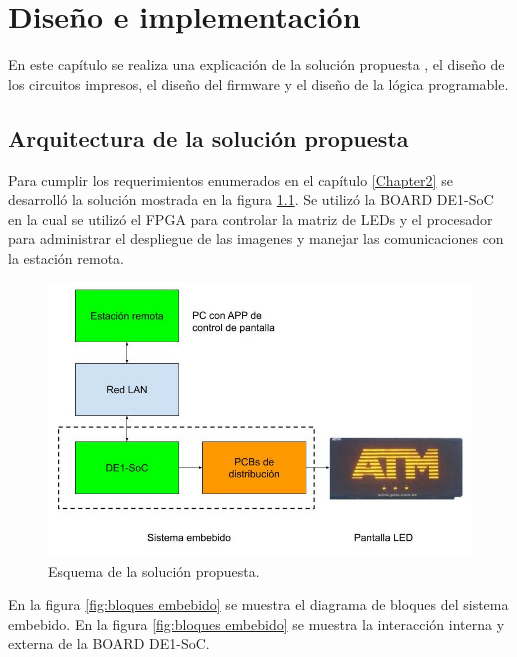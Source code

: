 \chapter{Diseño e implementación} %

\label{Chapter3} 
En este capítulo se realiza una explicación de la solución propuesta , el diseño de los circuitos impresos, el diseño del firmware y el diseño de la lógica programable.

\section{ Arquitectura de la solución propuesta}
Para cumplir los requerimientos enumerados en el capítulo \ref{Chapter2} se desarrolló la solución mostrada en la figura \ref{fig:solución}. Se utilizó la BOARD DE1-SoC en la cual se utilizó el FPGA para controlar la matriz de LEDs y el procesador para administrar el despliegue de las imagenes y manejar las comunicaciones con la estación remota.
\begin{figure}[htpb]
	\centering
	\includegraphics[scale=2]{Figures/Diagramasistemavms.jpg} 
	\caption{Esquema de la solución propuesta.}
	\label{fig:solución}
\end{figure}

En la figura \ref{fig:bloques embebido} se muestra el diagrama de bloques del sistema embebido. En la figura \ref{fig:bloques embebido} se muestra la interacción interna y externa de la BOARD DE1-SoC.
 
